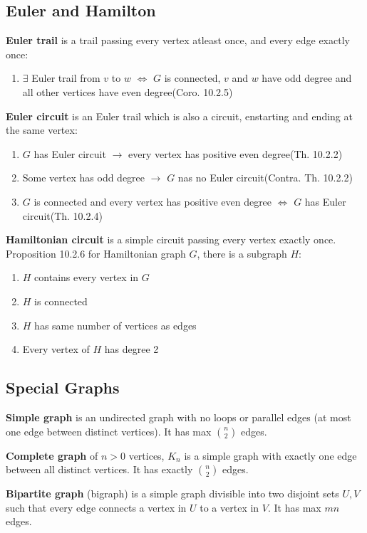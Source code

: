 \documentclass[12pt, a4paper]{article}
\begin{document}
\begin{multicols*}{3}
\subsection{Euler and Hamilton}
\textbf{Euler trail} is a trail passing every vertex atleast once, and every edge exactly once:
\begin{enumerate}[label=\roman*.]
  \item $\exists$ Euler trail from $v$ to $w$ $\iff$ $G$ is connected, $v$ and $w$ have odd degree and all other vertices have even degree\hfill(Coro. 10.2.5)
\end{enumerate}
\textbf{Euler circuit} is an Euler trail which is also a circuit, enstarting and ending at the same vertex:
\begin{enumerate}[label=\roman*.]
  \item $G$ has Euler circuit $\rightarrow$ every vertex has positive even degree\hfill(Th. 10.2.2)
  \item Some vertex has odd degree $\rightarrow$ $G$ nas no Euler circuit\hfill(Contra. Th. 10.2.2)
  \item $G$ is connected and every vertex has positive even degree $\iff$ $G$ has Euler circuit\hfill(Th. 10.2.4)
\end{enumerate}
\textbf{Hamiltonian circuit} is a simple circuit passing every vertex exactly once.\\
Proposition 10.2.6 for Hamiltonian graph $G$, there is a subgraph $H$:
\begin{enumerate}[\roman*.]
  \item $H$ contains every vertex in $G$
  \item $H$ is connected
  \item $H$ has same number of vertices as edges
  \item Every vertex of $H$ has degree 2
\end{enumerate}

\colbreak
\subsection{Special Graphs}
\textbf{Simple graph} is an undirected graph with no loops or parallel edges (at most one edge between distinct vertices). It has max $\binom n2$ edges.

\textbf{Complete graph} of $n > 0$ vertices, $K_n$ is a simple graph with exactly one edge between all distinct vertices. It has exactly $\binom n2$ edges.

\textbf{Bipartite graph} (bigraph) is a simple graph divisible into two disjoint sets $U, V$ such that every edge connects a vertex in $U$ to a vertex in $V$. It has max $mn$ edges.


\end{multicols*}
\end{document}
